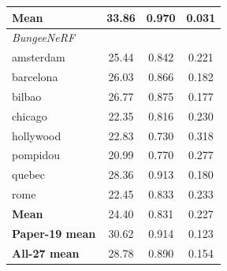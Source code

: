 \begin{table}[t]
\begin{tabular}{lccc}
\textbf{Mean} & 33.86 & 0.970 & 0.031 \\
\midrule
\multicolumn{4}{l}{\textit{BungeeNeRF}} \\
amsterdam & 25.44 & 0.842 & 0.221 \\
barcelona & 26.03 & 0.866 & 0.182 \\
bilbao & 26.77 & 0.875 & 0.177 \\
chicago & 22.35 & 0.816 & 0.230 \\
hollywood & 22.83 & 0.730 & 0.318 \\
pompidou & 20.99 & 0.770 & 0.277 \\
quebec & 28.36 & 0.913 & 0.180 \\
rome & 22.45 & 0.833 & 0.233 \\
\textbf{Mean} & 24.40 & 0.831 & 0.227 \\
\midrule
\textbf{Paper-19 mean} & 30.62 & 0.914 & 0.123 \\
\textbf{All-27 mean} & 28.78 & 0.890 & 0.154 \\
\bottomrule
\end{tabular}
\end{table}
